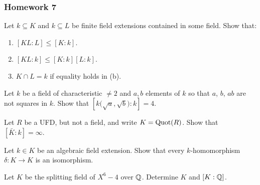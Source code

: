 \subsubsection{Homework 7}
\setcounter{exercise}{0}

\begin{problem}
  Let $k\subseteq K$ and $k\subseteq L$ be finite field extensions
  contained in some field. Show that:
  \begin{enumerate}[label=(\alph*),noitemsep]
  \item $[KL:L]\leq[K:k]$.
  \item $[KL:k]\leq[K:k][L:k]$.
  \item $K\cap L=k$ if equality holds in (b).
  \end{enumerate}
\end{problem}
\begin{solution}
\end{solution}

\begin{problem}
  Let $k$ be a field of characteristic $\neq 2$ and $a,b$ elements of
  $k$ so that $a$, $b$, $ab$ are not squares in $k$. Show that
  $\left[k{\bigl(\sqrt{a},\sqrt{b}\bigr)}:k\right]=4$.
\end{problem}
\begin{solution}
\end{solution}

\begin{problem}
  Let $R$ be a UFD, but not a field, and write $ K=\operatorname{Quot}(R)$. Show
  that $[\bar K:k]=\infty$.
\end{problem}
\begin{solution}
\end{solution}

\begin{problem}
  Let $k\in K$ be an algebraic field extension. Show that every
  $k$-homomorphism $\delta\colon K\to K$ is an isomorphism.
\end{problem}
\begin{solution}
\end{solution}

\begin{problem}
  Let $ K$ be the splitting field of $X^6-4$ over $\mathbb{Q}$. Determine
  $ K$ and $[ K:\mathbb{Q}]$.
\end{problem}
\begin{solution}
\end{solution}

